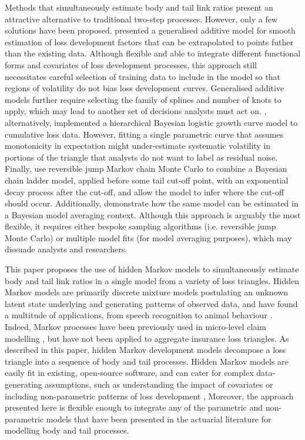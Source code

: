 Methods that simultaneously estimate body
and tail link ratios 
present an attractive alternative
to traditional two-step processes. However, only a few
solutions have been proposed.
\cite{englandverrall2001} presented a generalised
additive model for smooth estimation of loss development
factors that can be extrapolated to points futher
than the existing data. Although flexible and able to
integrate different functional forms and covariates
of loss development processes, this approach
still necessitates careful selection of training data
to include in the model so that regions of volatility
do not bias loss development curves. Generalised additive models
further require selecting the family of splines and
number of knots to apply, which may lead to another
set of decisions analysts must act on.
\cite{zhang2012}, alternatively,
implemented a hierarchical Bayesian logistic growth curve model to
cumulative loss data. However, fitting a single parametric
curve that assumes monotonicity in expectation might under-estimate
systematic volatility in portions of the triangle that
analysts do not want to label as residual noise.
Finally, \cite{verrall2012} use reversible jump Markov
chain Monte Carlo to combine a Bayesian chain ladder model,
applied before some tail cut-off point, with an exponential
decay process after the cut-off, and allow the model to infer
where the cut-off should occur. Additionally, 
\cite{verrall2015} demonstrate how the same model
can be estimated in a Bayesian model averaging context.
Although this approach is arguably the most flexible,
it requires either bespoke sampling algorithms (i.e. reversible
jump Monte Carlo) or
multiple model fits (for model averaging purposes),
which may dissuade analysts and researchers.

This paper proposes the use of hidden Markov models
to simultaneously estimate body and tail link ratios
in a single model from a variety of loss triangles. 
Hidden Markov models are 
primarily discrete mixture models postulating an unknown 
latent state
underlying and generating patterns of observed data,
and have found a multitude of applications, 
from speech recognition \citep[e.g.][]{rabiner1989}
to animal behaviour \citep[e.g.][]{leos2017}.
Indeed, Markov processes have been previously used
in micro-level claim 
modelling \citep[e.g.][]{hesselager1994}, but
have not been applied to aggregate insurance
loss triangles.
As described in this paper, hidden Markov 
development models decompose 
a loss triangle into a sequence of body and tail
processes.
Hidden Markov models are easily fit
in existing, open-source software, and can cater
for complex data-generating assumptions,
such as understanding the impact of covariates
or including non-parametric patterns of loss development 
\citep{englandverrall2001},
Moreover, the approach presented here is flexible
enough to integrate any of the parametric and non-parametric
models that have been presented in the actuarial literature
for modelling body and tail processes.

